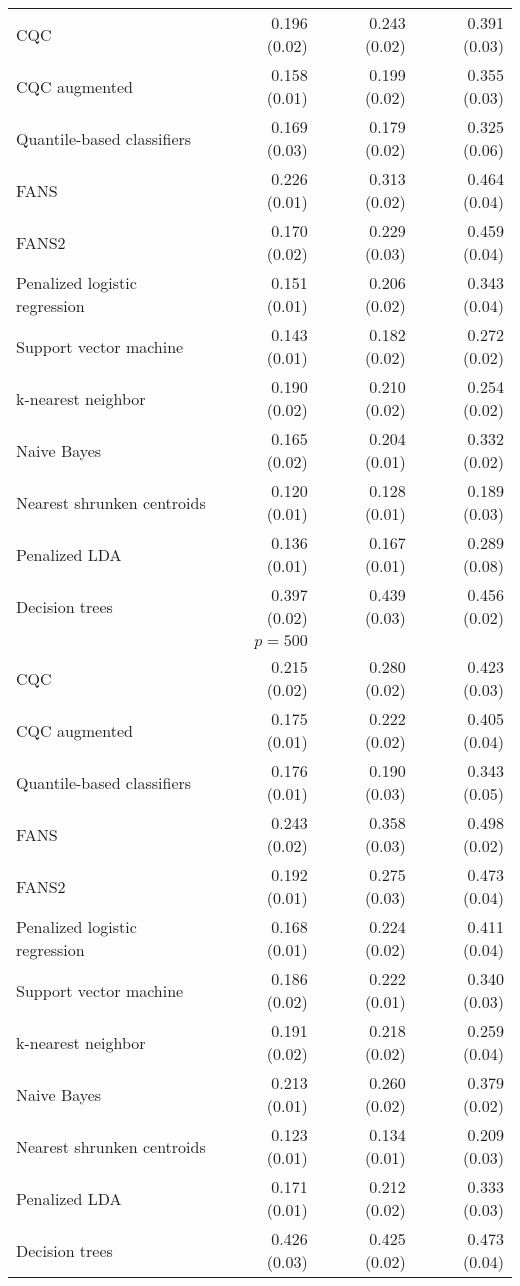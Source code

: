 \begin{table}[p]
\begin{adjustbox}{max size={\textwidth}{10cm}}
\begin{tabular}{l@{\extracolsep{15mm}}rrr}
      CQC & 0.196 (0.02) & 0.243 (0.02) & 0.391 (0.03) \\ 
      CQC augmented & 0.158 (0.01) & 0.199 (0.02) & 0.355 (0.03) \\ 
      Quantile-based classifiers & 0.169 (0.03) & 0.179 (0.02) & 0.325 (0.06) \\ 
      FANS  & 0.226 (0.01) & 0.313 (0.02) & 0.464 (0.04) \\
      FANS2 & 0.170 (0.02) & 0.229 (0.03) & 0.459 (0.04) \\
      Penalized logistic regression & 0.151 (0.01) & 0.206 (0.02) & 0.343 (0.04) \\ 
      Support vector machine & 0.143 (0.01) & 0.182 (0.02) & 0.272 (0.02) \\ 
      k-nearest neighbor & 0.190 (0.02) & 0.210 (0.02) & 0.254 (0.02) \\ 
      Naive Bayes & 0.165 (0.02) & 0.204 (0.01) & 0.332 (0.02) \\ 
      Nearest shrunken centroids & 0.120 (0.01) & 0.128 (0.01) & 0.189 (0.03) \\ 
      Penalized LDA & 0.136 (0.01) & 0.167 (0.01) & 0.289 (0.08) \\ 
      Decision trees & 0.397 (0.02) & 0.439 (0.03) & 0.456 (0.02) \\ [2ex]

      \hline
      & $p = 500$ \\
      \hline

      CQC & 0.215 (0.02) & 0.280 (0.02) & 0.423 (0.03) \\ 
      CQC augmented & 0.175 (0.01) & 0.222 (0.02) & 0.405 (0.04) \\  
      Quantile-based classifiers & 0.176 (0.01) & 0.190 (0.03) & 0.343 (0.05) \\ 
      FANS  & 0.243 (0.02) & 0.358 (0.03) & 0.498 (0.02) \\
      FANS2 & 0.192 (0.01) & 0.275 (0.03) & 0.473 (0.04) \\
      Penalized logistic regression & 0.168 (0.01) & 0.224 (0.02) & 0.411 (0.04) \\ 
      Support vector machine & 0.186 (0.02) & 0.222 (0.01) & 0.340 (0.03) \\ 
      k-nearest neighbor & 0.191 (0.02) & 0.218 (0.02) & 0.259 (0.04) \\ 
      Naive Bayes & 0.213 (0.01) & 0.260 (0.02) & 0.379 (0.02) \\ 
      Nearest shrunken centroids & 0.123 (0.01) & 0.134 (0.01) & 0.209 (0.03) \\ 
      Penalized LDA & 0.171 (0.01) & 0.212 (0.02) & 0.333 (0.03) \\ 
      Decision trees & 0.426 (0.03) & 0.425 (0.02) & 0.473 (0.04) \\ 

      \hline
      
    \end{tabular}
  \end{adjustbox}
\end{table}




